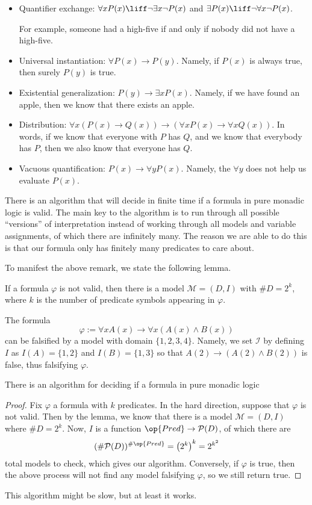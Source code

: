 \begin{itemize}
	\item Quantifier exchange: $\forall xP(x)\liff\lnot\exists x\lnot P(x)$ and $\exists P(x)\liff\lnot\forall x\lnot P(x)$.

	For example, someone had a high-five if and only if nobody did not have a high-five.

	\item Universal instantiation: $\forall P(x)\to P(y)$. Namely, if $P(x)$ is always true, then surely $P(y)$ is true.

	\item Existential generalization: $P(y)\to\exists xP(x)$. Namely, if we have found an apple, then we know that there exists an apple.

	\item Distribution: $\forall x(P(x)\to Q(x))\to(\forall xP(x)\to\forall xQ(x))$. In words, if we know that everyone with $P$ has $Q$, and we know that everybody has $P$, then we also know that everyone has $Q$.

	\item Vacuous quantification: $P(x)\to\forall yP(x)$. Namely, the $\forall y$ does not help us evaluate $P(x)$.
\end{itemize}
\begin{remark}
	There is an algorithm that will decide in finite time if a formula in pure monadic logic is valid. The main key to the algorithm is to run through all possible ``versions'' of interpretation instead of working through all models and variable assignments, of which there are infinitely many. The reason we are able to do this is that our formula only has finitely many predicates to care about.
\end{remark}
To manifest the above remark, we state the following lemma.
\begin{lemma}
	If a formula $\varphi$ is not valid, then there is a model $\mathcal M=(D,I)$ with $\#D=2^k$, where $k$ is the number of predicate symbols appearing in $\varphi$.
\end{lemma}
\begin{example}
	The formula
	\[\varphi:=\forall xA(x)\to\forall x(A(x)\land B(x))\]
	can be falsified by a model with domain $\{1,2,3,4\}$. Namely, we set $\mathcal I$ by defining $I$ as $I(A)=\{1,2\}$ and $I(B)=\{1,3\}$ so that $A(2)\to(A(2)\land B(2))$ is false, thus falsifying $\varphi$.
\end{example}
\begin{corollary}
	There is an algorithm for deciding if a formula in pure monadic logic
\end{corollary}
\begin{proof}
	Fix $\varphi$ a formula with $k$ predicates. In the hard direction, suppose that $\varphi$ is not valid. Then by the lemma, we know that there is a model $\mathcal M=(D,I)$ where $\#D=2^k$. Now, $I$ is a function $\op{Pred}\to\mathcal P(D)$, of which there are
	\[(\#\mathcal P(D))^{\#\op{Pred}}=\left(2^k\right)^k=2^{k^2}\]
	total models to check, which gives our algorithm. Conversely, if $\varphi$ is true, then the above process will not find any model falsifying $\varphi$, so we still return true.
\end{proof}
This algorithm might be slow, but at least it works.